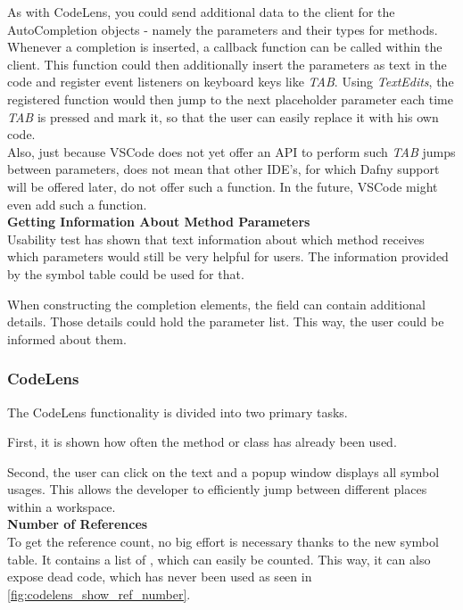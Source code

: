 As with CodeLens, you could send additional data to the client
for the AutoCompletion objects - namely the parameters and their types for methods.
Whenever a completion is inserted, a callback function can be called within the client.
This function could then additionally insert the parameters as text in the code and register
event listeners on keyboard keys like \textit{TAB}.
Using \textit{TextEdits}, the registered function would then jump to the next placeholder parameter
each time \textit{TAB} is pressed and mark it, so that the user can easily replace it with his own code. \\

Also, just because VSCode does not yet offer an API to perform such \textit{TAB} jumps between parameters,
does not mean that other IDE's, for which Dafny support will be offered later,
do not offer such a function.
In the future, VSCode might even add such a function. \\

\textbf{Getting Information About Method Parameters} \\
Usability test has shown that text information about which method
receives which parameters would still be very helpful for users.
The information provided by the symbol table could be used for that.

When constructing the completion elements,
the field  can contain additional details.
Those details could hold the parameter list.
This way, the user could be informed about them.\\


\subsubsection{CodeLens}
\label{section:implementation:features:codelens}
The CodeLens functionality is divided into two primary tasks.

First, it is shown how often the method or class has already been used.

Second, the user can click on the text and a popup window displays all symbol usages.
This allows the developer to efficiently jump between different places within a workspace.\\

\textbf{Number of References} \\
To get the reference count, no big effort is necessary thanks to the new symbol table.
It contains a list of , which can easily be counted.
This way, it can also expose dead code, which has never been used as seen in \ref{fig:codelens_show_ref_number}. \\

